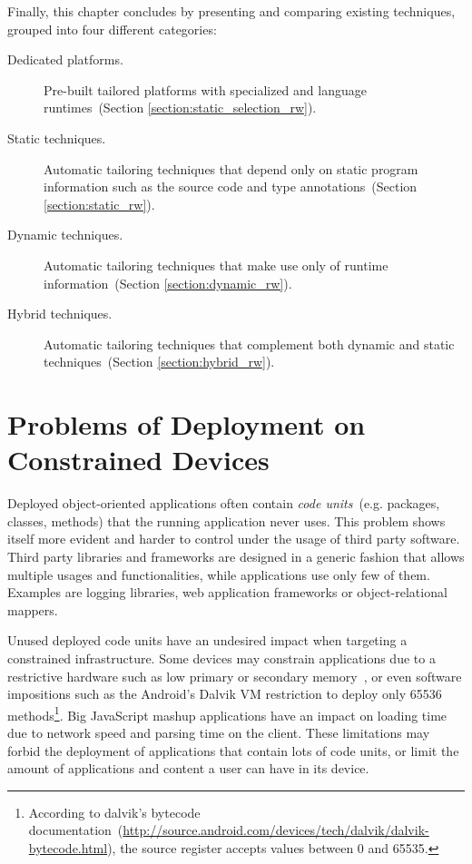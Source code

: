 Finally, this chapter concludes by presenting and comparing existing techniques, grouped into four different categories: 
\begin{description}
\item[Dedicated platforms.] Pre-built tailored platforms with specialized \VMs and language runtimes~(Section \ref{section:static_selection_rw}).
\item[Static techniques.] Automatic tailoring techniques that depend only on static program information such as the source code and type annotations~(Section \ref{section:static_rw}).
\item[Dynamic techniques.] Automatic tailoring techniques that make use only of runtime information~(Section \ref{section:dynamic_rw}).
\item[Hybrid techniques.] Automatic tailoring techniques that complement both dynamic and static techniques~(Section \ref{section:hybrid_rw}).
\end{description}


\section{Problems of Deployment on Constrained Devices}\label{sec:footprint_problems}
Deployed object-oriented applications often contain \emph{code units}~(e.g. packages, classes, methods) that the running application never uses.
This problem shows itself more evident and harder to control under the usage of third party software. 
Third party libraries and frameworks are designed in a generic fashion that allows multiple usages and functionalities, while applications use only few of them. 
Examples are logging libraries, web application frameworks or object-relational mappers.

Unused deployed code units have an undesired impact when targeting a constrained infrastructure. 
Some devices may constrain applications due to a restrictive hardware such as low primary or secondary memory~\cite{Mart12a}, or even software impositions such as the Android's Dalvik VM restriction to deploy only 65536 methods\footnote{According to dalvik's bytecode documentation~(\url{http://source.android.com/devices/tech/dalvik/dalvik-bytecode.html}), the source register accepts values between 0 and 65535.}. Big JavaScript mashup applications have an impact on loading time due to network speed and parsing time on the client.
These limitations may forbid the deployment of applications that contain lots of code units, or limit the amount of applications and content a user can have in its device.

